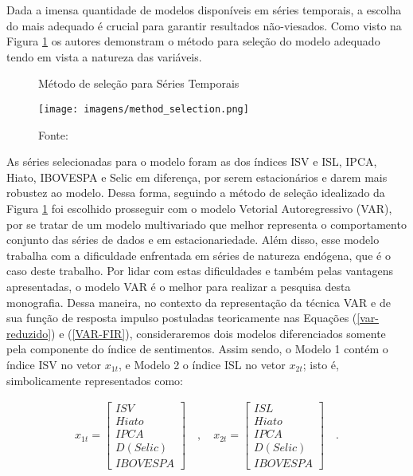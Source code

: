 Dada a imensa quantidade de modelos disponíveis em séries temporais, a escolha do mais adequado é crucial para garantir resultados não-viesados. Como visto na Figura \ref{fig: select_model} os autores  demonstram o método para seleção do modelo adequado tendo em vista a natureza das variáveis.

\begin{figure}[!h]
    \centering
    \caption{Método de seleção para Séries Temporais}
    \label{fig: select_model}
    \texttt{[image: imagens/method\_selection.png]}
    \caption*{Fonte: \cite{method-select}}
\end{figure}

As séries selecionadas para o modelo foram as dos índices ISV e ISL, IPCA, Hiato,  IBOVESPA e Selic em diferença, por serem estacionários e darem mais robustez ao modelo. Dessa forma, seguindo a método de seleção idealizado da Figura \ref{fig: select_model} foi escolhido prosseguir com o modelo Vetorial Autoregressivo (VAR), por se tratar de um modelo multivariado que melhor representa o comportamento conjunto das séries de dados e em estacionariedade. Além disso, esse modelo trabalha com a dificuldade enfrentada em séries de natureza endógena, que é o caso deste trabalho. Por lidar com estas dificuldades e também pelas vantagens apresentadas, o modelo VAR é o melhor para realizar a pesquisa desta monografia. Dessa maneira, no contexto da representação da técnica VAR e de sua função de resposta impulso postuladas teoricamente nas Equações (\ref{var-reduzido}) e (\ref{VAR-FIR}), consideraremos dois modelos diferenciados somente pela componente do índice de sentimentos. Assim sendo, o Modelo 1 contém o índice ISV no vetor $x_{1t}$, e Modelo 2 o índice ISL no vetor $x_{2t}$; isto é, simbolicamente representados como:

\begin{align}
    x_{1t} = 
    \begin{bmatrix}
    ISV \\ Hiato \\ IPCA \\ D(Selic) \\ IBOVESPA
    \end{bmatrix}
\quad , \quad
    x_{2t} = 
    \begin{bmatrix}
    ISL \\ Hiato \\ IPCA \\ D(Selic) \\ IBOVESPA
    \end{bmatrix}
\quad .
\end{align}

